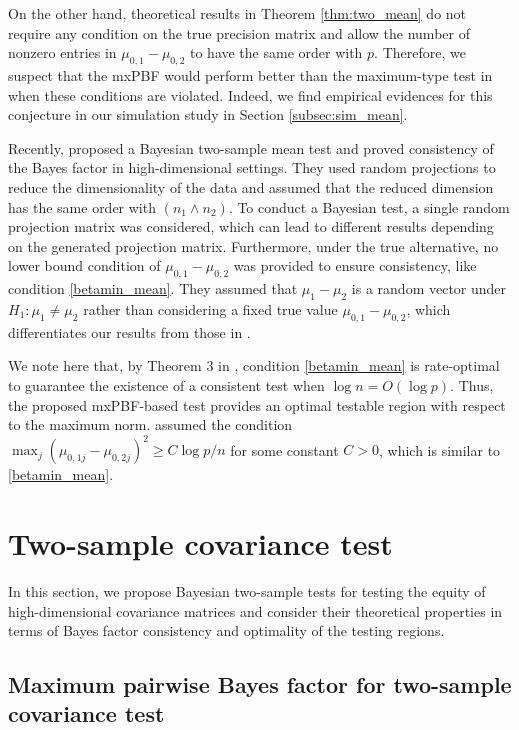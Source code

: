 \documentclass[11pt]{article}
\begin{document}
On the other hand, theoretical results in Theorem \ref{thm:two_mean} do not require any condition on the true precision matrix and allow the number of nonzero entries in $\mu_{0,1}-\mu_{0,2}$ to have the same order with $p$.
Therefore, we suspect that the mxPBF would perform better than the maximum-type test in \cite{cai2014two} when these conditions are violated.
Indeed, we find empirical evidences for this conjecture in our simulation study in Section \ref{subsec:sim_mean}.


Recently, \cite{zoh2018powerful} proposed a Bayesian two-sample mean test and proved consistency of the Bayes factor in high-dimensional settings.
They used random projections to reduce the dimensionality of the data and assumed that the reduced dimension has the same order with $(n_1\wedge n_2)$.
To conduct a Bayesian test, a single random projection matrix was considered, which can lead to different results depending on the generated projection matrix.
Furthermore, under the true alternative,  no lower bound condition of $\mu_{0,1}- \mu_{0,2}$ was provided to ensure consistency, like condition \eqref{betamin_mean}. 
They assumed that $\mu_1 - \mu_2$ is a random vector under $H_1:\mu_1 \neq \mu_2$ rather than considering a fixed true value  $\mu_{0,1}- \mu_{0,2}$, which differentiates our results from those in \cite{zoh2018powerful}.


We note here that, by Theorem 3  in \cite{cai2014two}, condition \eqref{betamin_mean} is rate-optimal to guarantee the existence of a consistent test when $\log n = O( \log p )$.
Thus, the proposed mxPBF-based test provides an optimal testable region with respect to the maximum norm.
\cite{cai2014two} assumed the condition $\max_j (\mu_{0,1j}-\mu_{0,2j})^2 \ge C \log p/n$ for some constant $C>0$, which is similar to \eqref{betamin_mean}.


\section{Two-sample covariance test}\label{sec:cov}
In this section, we propose  Bayesian  two-sample tests for testing the equity of high-dimensional covariance matrices and consider their theoretical properties in terms of Bayes factor consistency and optimality of the testing regions. 

\subsection{Maximum pairwise Bayes factor for two-sample covariance test}\label{subsec:mxPBF_cov}
\end{document}
